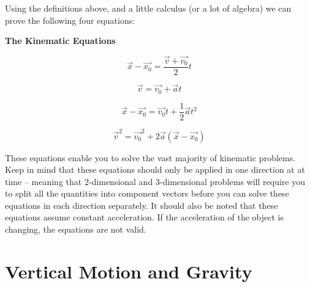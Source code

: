  \label{kinematicequations}
Using the definitions above, and a little calculus (or a lot of algebra) we can prove the following four equations:
\begin{mdframed}[backgroundcolor=orange!20!white]
	\begin{center}
		\textbf{The Kinematic Equations}
	\end{center}
	\begin{multicols}{2}
		\begin{equation}
		\overrightarrow{x}-\overrightarrow{x_0} = \frac{\overrightarrow{v} + \overrightarrow{v_0}}{2}  t
		\label{equation:kinematic1}
		\end{equation}
			
		\begin{equation}
		\overrightarrow{v} = \overrightarrow{v_0} + \vec{a} t
		\label{equation:kinematic2}
		\end{equation}	
			
		\begin{equation}
		\overrightarrow{x}-\overrightarrow{x_0} = \overrightarrow{v_0} t + \frac{1}{2}\vec{a}{t}^2
		\label{equation:kinematic3}
		\end{equation}
		
		\begin{equation}
		\overrightarrow{v}^2 = \overrightarrow{v_0}^2 + 2\vec{a}(\overrightarrow{x}-\overrightarrow{x_0})
		\label{equation:kinematic4}
		\end{equation}
		
		
			
		\end{multicols}
	\end{mdframed}

These equations enable you to solve the vast majority of kinematic problems.  Keep in mind that these equations should only be applied in one direction at at time – meaning that 2-dimensional and 3-dimensional problems will require you to split all the quantities into component vectors before you can solve these equations in each direction separately. It should also be noted that these equations assume constant acceleration.  If the acceleration of the object is changing, the equations are not valid.



\section{Vertical Motion and Gravity}


